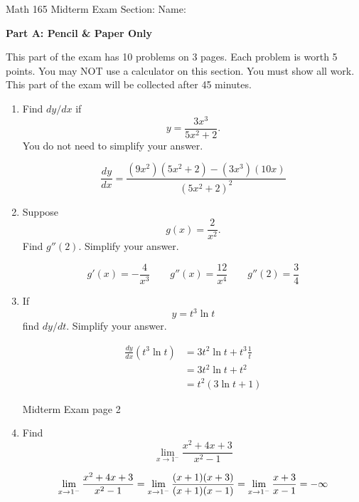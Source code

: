 \documentclass[12pt]{article}
\begin{document}
\pagestyle{empty}


\noindent Math 165 Midterm Exam \hskip1cm Section:\underline{\phantom{XXXXXX}} \hfill Name:\underline{\phantom{XXXXXXXXXX}}

\bigskip

{\bf Part A: Pencil \& Paper Only}

\bigskip

\noindent This part of the exam has 10 problems on 3 pages. Each problem is worth 5 points. You
may NOT use a calculator on this section. You must show all work. This part of the exam
will be collected after 45 minutes.

\begin{enumerate}
\item 
Find $dy/dx$ if
\[
y = \frac{3x^3}{5x^2 + 2}.
\]
You do not need to simplify your answer.

\medskip


\[
\frac{dy}{dx} = \frac{(9x^2)(5x^2 + 2) - (3x^3)(10x)}{(5x^2+2)^2}
\]

\medskip

\item
Suppose 
\[
g(x) = \frac{2}{x^2}.
\]
Find $g''(2)$. Simplify your answer.

\medskip
{}
\[
g'(x) = -\frac{4}{x^3}
\qquad
g''(x) = \frac{12}{x^4}
\qquad
g''(2) = \frac{3}{4}
\]
\bigskip

\item If 
\[
y = t^3 \ln t
\]
find $dy/dt$. Simplify your answer.

\medskip
{}
\begin{align*}
\frac{dy}{dx}(t^3\ln t) &= 3t^2\ln t + t^3\frac{1}{t}\\
&= 3t^2\ln t + t^2 \\
&= t^2(3\ln t + 1)
\end{align*}

\bigskip

\newpage

\noindent Midterm Exam \hfill page 2

\item Find
\[
\lim_{x\rightarrow 1^-} \frac{x^2 + 4x + 3}{x^2 - 1}
\]

\medskip
{}
\[
\lim_{x\rightarrow 1^-} \frac{x^2 + 4x + 3}{x^2 - 1}=\lim_{x\rightarrow 1^-} \frac{(x+1)(x+3)}{(x+1)(x-1)}
=\lim_{x\rightarrow 1^-} \frac{x+3}{x-1}\\ 
=-\infty
\]


\end{enumerate}
\end{document}
